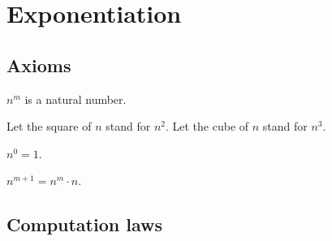 \documentclass[../../natural-numbers.ftl.tex]{subfiles}
\begin{document}


  \section{Exponentiation}

  \subsection{Axioms}

  \begin{forthel}
    \begin{signature}
      $n^{m}$ is a natural number.
    \end{signature}

    Let the square of $n$ stand for $n^{2}$.
    Let the cube of $n$ stand for $n^{3}$.

    \begin{axiom}
      $n^{0} = 1$.
    \end{axiom}

    \begin{axiom}
      $n^{m + 1} = n^{m} \cdot n$.
    \end{axiom}
  \end{forthel}


  \subsection{Computation laws}
\end{document}
